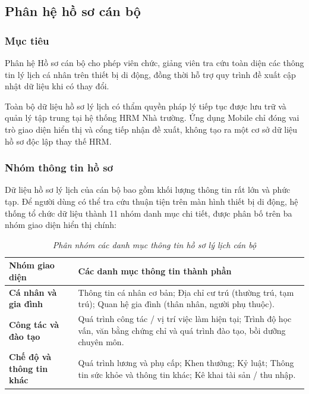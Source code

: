 \subsection{Phân hệ hồ sơ cán bộ}
\label{subsec:req_profile}

\subsubsection{Mục tiêu}
Phân hệ Hồ sơ cán bộ cho phép viên chức, giảng viên tra cứu toàn diện các thông tin lý lịch cá nhân trên thiết bị di động, đồng thời hỗ trợ quy trình đề xuất cập nhật dữ liệu khi có thay đổi.

Toàn bộ dữ liệu hồ sơ lý lịch có thẩm quyền pháp lý tiếp tục được lưu trữ và quản lý tập trung tại hệ thống HRM Nhà trường. Ứng dụng Mobile chỉ đóng vai trò giao diện hiển thị và cổng tiếp nhận đề xuất, không tạo ra một cơ sở dữ liệu hồ sơ độc lập thay thế HRM.

\subsubsection{Nhóm thông tin hồ sơ}
Dữ liệu hồ sơ lý lịch của cán bộ bao gồm khối lượng thông tin rất lớn và phức tạp. Để người dùng có thể tra cứu thuận tiện trên màn hình thiết bị di động, hệ thống tổ chức dữ liệu thành 11 nhóm danh mục chi tiết, được phân bố trên ba nhóm giao diện hiển thị chính:

\begin{table}[H]
\centering
\caption[\textit{Phân nhóm danh mục thông tin hồ sơ lý lịch}]{\textit{Phân nhóm các danh mục thông tin hồ sơ lý lịch cán bộ}}
\label{tab:profile_groups}
\vspace{0.15cm}
\begin{tabularx}{\textwidth}{|L{4.2cm}|Y|}
\hline
\textbf{Nhóm giao diện} & \textbf{Các danh mục thông tin thành phần} \\
\hline
\textbf{Cá nhân và gia đình} & Thông tin cá nhân cơ bản; Địa chỉ cư trú (thường trú, tạm trú); Quan hệ gia đình (thân nhân, người phụ thuộc). \\
\hline
\textbf{Công tác và đào tạo} & Quá trình công tác / vị trí việc làm hiện tại; Trình độ học vấn, văn bằng chứng chỉ và quá trình đào tạo, bồi dưỡng chuyên môn. \\
\hline
\textbf{Chế độ và thông tin khác} & Quá trình lương và phụ cấp; Khen thưởng; Kỷ luật; Thông tin sức khỏe và thông tin khác; Kê khai tài sản / thu nhập. \\
\hline
\end{tabularx}
\end{table}


